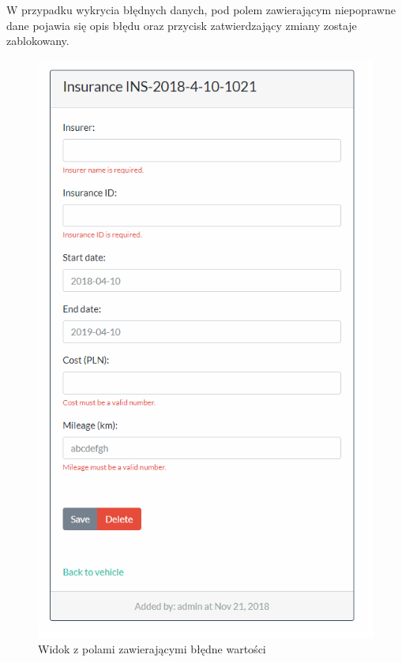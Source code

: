 \documentclass[eng,printmode,openany]{mgr}
\begin{document}
	
	
	W przypadku wykrycia błędnych danych, pod polem zawierającym niepoprawne dane pojawia się opis błędu oraz przycisk zatwierdzający zmiany zostaje zablokowany.
	\begin{figure}[H]
		\centering
		\includegraphics[scale=0.7]{images/insurance_validation_errors.png}
		\caption{Widok z polami zawierającymi błędne wartości}
	\end{figure}
	
\end{document}
